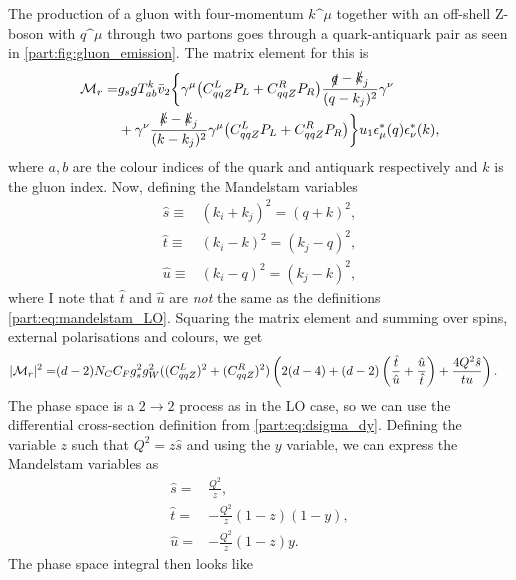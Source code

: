 \documentclass[../main.tex]{subfiles}
\begin{document}
The production of a gluon with four-momentum \(k\^\mu\) together with an off-shell Z-boson with \(q\^\mu\) through two partons goes through a quark-antiquark pair as seen in \cref{part:fig:gluon_emission}.
The matrix element for this is
\begin{align}
  \nonumber
  \mathcal{M}_r = & g_s g T_{ab}^k \bar{v}_2 \biggl\{
  \gamma^\mu \bigl(C_{qqZ}^L P_L + C_{qqZ}^R P_R\bigr) \frac{\slashed{q}-\slashed{k}_j}{(q-k_j)^2} \gamma^\nu            \\
         & + \gamma^\nu \frac{\slashed{k}-\slashed{k}_j}{(k-k_j)^2} \gamma^\mu \bigl(C_{qqZ}^L P_L + C_{qqZ}^R P_R\bigr)
  \biggr\} u_1 \epsilon_\mu^\ast(q) \epsilon_\nu^\ast(k),
\end{align}
where \(a,b\) are the colour indices of the quark and antiquark respectively and \(k\) is the gluon index.
Now, defining the Mandelstam variables
\begin{subequations}
  \label{part:eq:mandelstam_factorised}
  \begin{align}
    \hat{s} \equiv & (k_i+k_j)^2 = (q+k)^2, \\
    \hat{t} \equiv & (k_i-k)^2 = (k_j-q)^2, \\
    \hat{u} \equiv & (k_i-q)^2 = (k_j-k)^2,
  \end{align}
\end{subequations}
where I note that \(\hat{t}\) and \(\hat{u}\) are \emph{not} the same as the definitions \cref{part:eq:mandelstam_LO}.
Squaring the matrix element and summing over spins, external polarisations and colours, we get
\begin{align}
  |\mathcal{M}_r|^2 = & (d-2) N_C C_F g_s^2 g_W^2 ((C_{qqZ}^L)^2 + (C_{qqZ}^R)^2) \left(2(d-4) + (d-2)\left(\frac{\hat{t}}{\hat{u}}+\frac{\hat{u}}{\hat{t}}\right) + \frac{4Q^2\hat{s}}{tu}\right).
\end{align}
The phase space is a \(2\to 2\) process as in the LO case, so we can use the differential cross-section definition from \cref{part:eq:dsigma_dy}.
Defining the variable \(z\) such that \(Q^2 = z \hat{s}\) and using the \(y\) variable, we can express the Mandelstam variables as
\begin{subequations}
  \begin{align}
    \hat{s} = & \frac{Q^2}{z},            \\
    \hat{t} = & -\frac{Q^2}{z}(1-z)(1-y), \\
    \hat{u} = & -\frac{Q^2}{z} (1-z)y.
  \end{align}
\end{subequations}
The phase space integral then looks like
\end{document}

